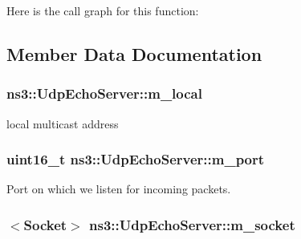 Here is the call graph for this function\+:




\subsection{Member Data Documentation}
\subsubsection[{\texorpdfstring{m\+\_\+local}{m_local}}]{ ns3\+::\+Udp\+Echo\+Server\+::m\+\_\+local\hspace{0.3cm}{\ttfamily [private]}}\hypertarget{classns3_1_1UdpEchoServer_a231b982647342912704bbcf444b01806}{}\label{classns3_1_1UdpEchoServer_a231b982647342912704bbcf444b01806}


local multicast address 

\subsubsection[{\texorpdfstring{m\+\_\+port}{m_port}}]{\setlength{\rightskip}{0pt plus 5cm}uint16\+\_\+t ns3\+::\+Udp\+Echo\+Server\+::m\+\_\+port\hspace{0.3cm}{\ttfamily [private]}}\hypertarget{classns3_1_1UdpEchoServer_a032318eadecb7de407f10f1960cadb7b}{}\label{classns3_1_1UdpEchoServer_a032318eadecb7de407f10f1960cadb7b}


Port on which we listen for incoming packets. 

\subsubsection[{\texorpdfstring{m\+\_\+socket}{m_socket}}]{$<${\bf Socket}$>$ ns3\+::\+Udp\+Echo\+Server\+::m\+\_\+socket\hspace{0.3cm}{\ttfamily [private]}}\hypertarget{classns3_1_1UdpEchoServer_ab7aa28adb2e7743fb2b3c12d4f6da8bd}{}\label{classns3_1_1UdpEchoServer_ab7aa28adb2e7743fb2b3c12d4f6da8bd}


